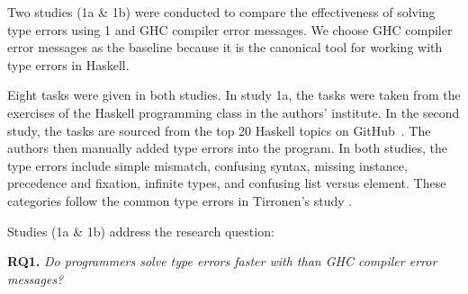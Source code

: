 
Two  studies (1a \& 1b) were conducted to compare the effectiveness of solving type errors using \chameleon{} 1 and GHC compiler error messages. We choose GHC compiler error messages as the baseline because it is the canonical tool for working with type errors in Haskell.


Eight tasks were given in both studies. In study 1a, the tasks were taken from the exercises of the Haskell programming class in the authors' institute. In the second study, the tasks are sourced from the top 20 Haskell topics on GitHub~\cite{Github2022-nm}. The authors then manually added type errors into the program. In both studies, the type errors include simple mismatch, confusing syntax, missing instance, precedence and fixation, infinite types, and confusing list versus element. These categories follow the common type errors in Tirronen's study \cite{Tirronen2015-nr}. 

Studies (1a \& 1b) address the research question:

\noindent\textbf{RQ1.} \textit{Do programmers solve type errors faster with \chameleon{} than GHC compiler error messages?}





